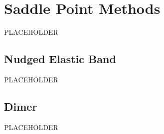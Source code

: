 \section{Saddle Point Methods}
PLACEHOLDER
\subsection{Nudged Elastic Band}
PLACEHOLDER
\subsection{Dimer}
PLACEHOLDER
